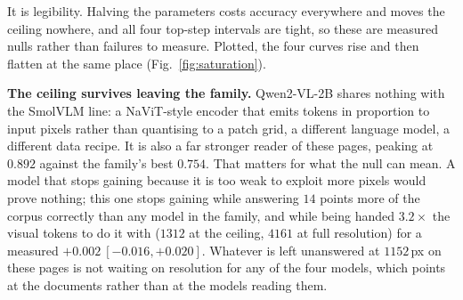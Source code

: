 \documentclass[10pt,twocolumn]{article}
\theoremstyle{plain}
\begin{document}
\begin{table}[t]
\centering\small
\setlength{\tabcolsep}{4pt}
\caption{ANLS accuracy by rung, four models on the same DocVQA pages ($1200$
for the SmolVLM family, the first $500$ for Qwen2-VL-2B), columns labelled by
the pixel target. Every top-step interval is a tight null: $[-0.026,+0.022]$,
$[-0.012,+0.037]$, $[-0.011,+0.041]$ and $[-0.016,+0.020]$, half-widths
$0.018$ to $0.026$.}
\label{tab:twomodels}
\end{table}

It is legibility. Halving the parameters costs accuracy everywhere and moves the
ceiling nowhere, and all four top-step intervals are tight, so these are
measured nulls rather than failures to measure. Plotted, the four curves rise
and then flatten at the same place (Fig.~\ref{fig:saturation}).

\textbf{The ceiling survives leaving the family.} Qwen2-VL-2B shares nothing
with the SmolVLM line: a NaViT-style encoder that emits tokens in proportion to
input pixels rather than quantising to a patch grid, a different language
model, a different data recipe. It is also a far stronger reader of these
pages, peaking at $0.892$ against the family's best $0.754$. That matters for
what the null can mean. A model that stops gaining because it is too weak to
exploit more pixels would prove nothing; this one stops gaining while
answering $14$ points more of the corpus correctly than any model in the
family, and while being handed $3.2\times$ the visual tokens to do it with
($1312$ at the ceiling, $4161$ at full resolution) for a measured
$+0.002\ [-0.016, +0.020]$. Whatever is left unanswered at $1152$\,px on these
pages is not waiting on resolution for any of the four models, which points at
the documents rather than at the models reading them.
\end{document}
